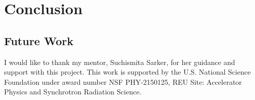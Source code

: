 \documentclass[twocolumn, nofootinbib, secnumarabic, amssymb, nobibnotes, aps, prd]{revtex4-2}
\begin{document}
\section{Conclusion}
\subsection{Future Work}

\begin{acknowledgments}
I would like to thank my mentor, Suchismita Sarker, for her guidance and support with this project. This work is supported by the U.S. National Science Foundation under award number NSF PHY-2150125, REU Site: Accelerator Physics and Synchrotron Radiation Science.
\end{acknowledgments}



\end{document}
